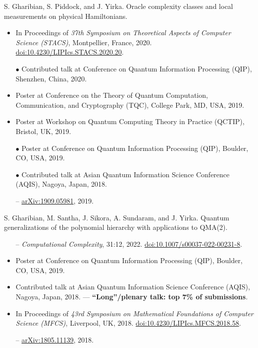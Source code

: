 \documentclass[11pt,letterpaper,serif]{moderncv}
\begin{document}
S. Gharibian, S. Piddock, and J. Yirka.\quad
Oracle complexity classes and local measurements on physical Hamiltonians.
\begin{adjustwidth}{.1in}{}
	\begin{itemize}
		\item In Proceedings of \textit{37th Symposium on Theoretical Aspects of Computer Science (STACS)}, Montpellier, France, 2020.\quad
		\href{https://doi.org/10.4230/LIPIcs.STACS.2020.20}{doi:10.4230/LIPIcs.STACS.2020.20}.
		\item[$\bullet$] Contributed talk at Conference on Quantum Information Processing (QIP), Shenzhen, China, 2020.
		\item Poster at Conference on the Theory of Quantum Computation, Communication, and Cryptography (TQC), College Park, MD, USA, 2019.
		\item Poster at Workshop on Quantum Computing Theory in Practice (QCTIP), Bristol, UK, 2019.
		\item[$\bullet$] Poster at Conference on Quantum Information Processing (QIP), Boulder, CO, USA, 2019.
		\item[$\bullet$] Contributed talk at Asian Quantum Information Science Conference (AQIS), Nagoya, Japan, 2018.
		\item[--]  \href{https://arxiv.org/abs/1909.05981}{arXiv:1909.05981}, 2019.
	\end{itemize}
\end{adjustwidth}
\medskip

S. Gharibian, M. Santha, J. Sikora, A. Sundaram, and J. Yirka.\quad
Quantum generalizations of the polynomial hierarchy with applications to QMA(2).
\begin{adjustwidth}{.1in}{}
	\begin{itemize}
		\item[--] \textit{Computational Complexity}, 31:12, 2022.\quad
		\href{https://doi.org/10.1007/s00037-022-00231-8}{doi:10.1007/s00037-022-00231-8}.
		\item Poster at Conference on Quantum Information Processing (QIP), Boulder, CO, USA, 2019.
		\item Contributed talk at Asian Quantum Information Science Conference (AQIS), Nagoya, Japan, 2018. --- \textbf{``Long''/plenary talk: top 7\% of submissions}.
		\item In Proceedings of \textit{43rd Symposium on Mathematical Foundations of Computer Science (MFCS)}, Liverpool, UK, 2018. \quad
		\href{https://doi.org/10.4230/LIPIcs.MFCS.2018.58}{doi:10.4230/LIPIcs.MFCS.2018.58}.
		\item[--] \href{https://arxiv.org/abs/1805.11139}{arXiv:1805.11139}, 2018.
	\end{itemize}
\end{adjustwidth}
\medskip
\end{document}
